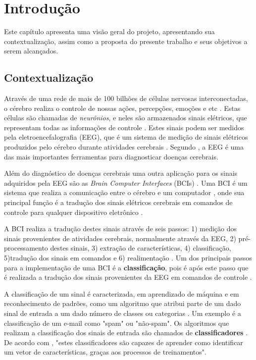 \chapter[Introdução]{Introdução}

Este capítulo apresenta uma visão geral do projeto, apresentando sua contextualização, assim como a proposta do presente trabalho e seus objetivos a serem alcançados.

\section{Contextualização}

Através de uma rede de mais de 100 bilhões de células nervosas interconectadas, o cérebro
realiza o controle de nossas ações, percepções, emoções e etc \cite{KANDEL}. Estas células
são chamadas de \textit{neurônios}, e neles são armazenados sinais elétricos, que representam
todas as informações de controle \cite{Siulybook}. Estes sinais podem ser medidos pela
eletroencefalografia (EEG), que é um sistema de medição de sinais elétricos produzidos pelo
cérebro durante atividades cerebrais \cite{F.Lotte}. Segundo \cite{SIULYDissertacao}, a EEG
é uma das mais importantes ferramentas para diagnosticar doenças cerebrais.

Além do diagnóstico de doenças cerebrais uma outra aplicação para os sinais adquiridos
pela EEG são as \textit{Brain Computer Interfaces} (BCIs) \cite{F.Lotte}. Uma BCI é um
sistema que realiza a comunicação entre o cérebro e um computador \cite{Siulybook}, onde
sua principal função é a tradução dos sinais elétricos cerebrais em comandos
de controle para qualquer dispositivo eletrônico \cite{Siulybook}.

A BCI realiza a tradução destes sinais através de seis passos: 1) medição dos sinais
provenientes de atividades cerebrais, normalmente através da EEG, 2) pré-processamento destes sinais,
3) extração de características, 4) classificação, 5)tradução dos sinais em comandos e 6)
realimentação \cite{MasonAndBirch}. Um dos principais passos para a implementação de uma
BCI é a \textbf{classificação}, pois é após este passo que é realizada a tradução dos sinais provenientes da EEG
em comandos de controle \cite{MasonAndBirch}.

A classificação de um sinal é caracterizada, em aprendizado de máquina e em reconhecimento de
padrões, como um algoritmo que atribui parte de um dado sinal de entrada a um dado número de
classes ou categorias \cite{brunelli2009template}. Um exemplo é a classificação de um e-mail
como "spam" ou "não-spam". Os algoritmos que realizam a classificação dos sinais de entrada são
chamados de \textbf{classificadores} \cite{Siulybook}. De acordo com \cite[p. 41]{lottephd}, "estes
classificadores são capazes de aprender como identificar um vetor de características, graças
aos processos de treinamentos".

